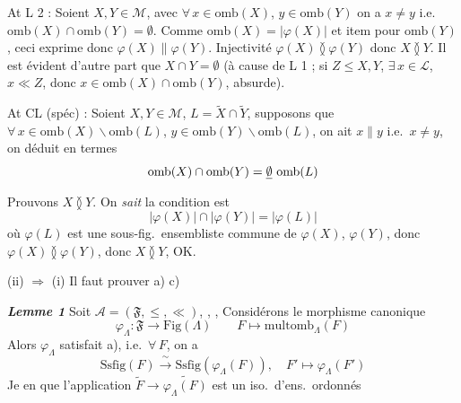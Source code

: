 \documentclass[11pt,a4paper]{article}
\begin{document}
At L 2 : Soient $X, Y \in \mathcal{M}$, avec $\forall\, x \in \mathrm{omb}(X)$, $y \in \mathrm{omb}(Y)$ on a $x \neq y$  i.e.\ $\mathrm{omb}(X) \cap \mathrm{omb}(Y) = \emptyset$.   Comme $\mathrm{omb}(X) = |\varphi(X)|$ et item pour $\mathrm{omb}(Y)$, ceci exprime donc $\varphi(X) \parallel \varphi(Y)$. Injectivité \struck{\ill{}} $\varphi(X) \between \varphi(Y)$ donc $X \between Y$. Il est évident d'autre part que $X \cap Y = \emptyset$ (à cause de L 1 ; si $Z \leq X, Y$, $\exists\, x \in \mathcal{L}$, $x \ll Z$, donc $x \in \mathrm{omb}(X) \cap \mathrm{omb}(Y)$, absurde).

At CL (spéc) : Soient $X, Y \in \mathcal{M}$, $L = \widetilde{X} \cap \widetilde{Y}$, supposons que $\forall\, x \in \mathrm{omb}(X) \smallsetminus \mathrm{omb}(L)$, $y \in \mathrm{omb}(Y) \smallsetminus \mathrm{omb}(L)$, on ait $x \parallel y$ i.e.\ $x \neq y$, on déduit en termes 
\[
  \mathrm{omb}(X) \cap \mathrm{omb}(Y) = \struck{\emptyset}\ \mathrm{omb}(L)
\]
Prouvons $X \between Y$. On \struck{\ill{}} \emph{sait}  la condition est
\[
  |\varphi(X)| \cap |\varphi(Y)| = |\varphi(L)|
\]
où $\varphi(L)$ est une sous-fig.\ ensembliste commune de $\varphi(X)$, $\varphi(Y)$, donc $\varphi(X) \between \varphi(Y)$, donc $X \between Y$, OK.

(ii) $\Longrightarrow$ (i)  Il faut prouver a) \struck{\ill{}} c)

\textbf{\emph{Lemme 1}} Soit $\mathcal{A} = (\mathfrak{F}, \leq, \ll)$, , , \struck{\ill{}} Considérons le \struck{\ill{}} morphisme canonique
\[
  \varphi_{\Lambda} : \mathfrak{F} \longrightarrow \mathrm{Fig}(\Lambda) \qquad F \longmapsto \mathrm{multomb}_{\Lambda}(F)
\]
Alors $\varphi_{\Lambda}$ satisfait a), i.e.\ $\forall\, F$, on a
\[
  \mathrm{Ssfig}(F) \xrightarrow{\ \sim\ } \mathrm{Ssfig}(\varphi_{\Lambda}(F)) , \quad F' \longmapsto \varphi_{\Lambda}(F')
\]
Je  en   que l'application $\widetilde{F} \longrightarrow \widetilde{\varphi_{\Lambda}(F)}$ est un iso.\ d'ens.\ ordonnés
\end{document}
